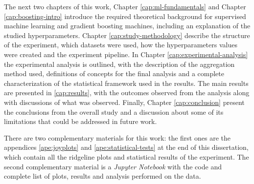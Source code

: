 The next two chapters of this work, Chapter \ref{cap:ml-fundamentals} and Chapter \ref{cap:boosting-intro} introduce the required theoretical background for supervised machine learning and gradient boosting machines, including an explanation of the studied hyperparameters. Chapter \ref{cap:study-methodology} describe the structure of the experiment, which datasets were used, how the hyperparameters values were created and the experiment pipeline. In Chapter \ref{cap:experimental-analysis} the experimental analysis is outlined, with the description of the aggregation method used, definitions of concepts for the final analysis and a complete characterization of the statistical framework used in the results. The main results are presented in \ref{cap:results}, with the outcomes observed from the analysis along with discussions of what was observed. Finally, Chapter \ref{cap:conclusion} present the conclusions from the overall study and a discussion about some of its limitations that could be addressed in future work.

There are two complementary materials for this work: the first ones are the appendices \ref{ape:joyplots} and \ref{ape:statistical-tests} at the end of this dissertation, which contain all the ridgeline plots and statistical results of the experiment. The second complementary material is a \textit{Jupyter Notebook} with the code and complete list of plots, results and analysis performed on the data.